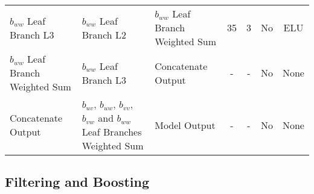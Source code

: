 \documentclass[11pt]{article}
\numberwithin{equation}{section}
\theoremstyle{plain}
\theoremstyle{definition}
\begin{document}
\begin{sidewaystable}[]
{\begin{tabular}{lllcccc}
$b_{ww}$ Leaf Branch L3                      & $b_{ww}$ Leaf Branch L2                                                & $b_{ww}$ Leaf Branch Weighted Sum                                       & 35                                     & 3                                            & No                                       & ELU                                      \\ 
$b_{ww}$ Leaf Branch Weighted Sum                 & $b_{ww}$ Leaf Branch L3                                                & Concatenate Output                                              & -                                      & -                                            & No                                       & None                                      \\ \midrule
Concatenate Output                        & $b_{uv}$, $b_{uw}$, $b_{vv}$, $b_{vw}$ and $b_{ww}$ Leaf Branches Weighted Sum & Model Output                                                    & -                                      & -                                            & No                                       & None                                     \\ \bottomrule
\end{tabular}
}
\label{tab:model_summary}
\end{sidewaystable}


\subsection{Filtering and Boosting}
\label{subsec: Filtering and Boosting}
\end{document}
